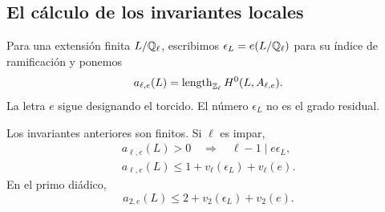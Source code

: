 \subsection{El cálculo de los invariantes locales}

Para una extensión finita $L/\mathbb{Q}_\ell$, escribimos
$\epsilon_L=e(L/\mathbb{Q}_\ell)$ para su índice de ramificación y ponemos
\[
 a_{\ell,e}(L)=\operatorname{length}_{\mathbb{Z}_\ell}H^0(L,A_{\ell,e}).
\]
La letra $e$ sigue designando el torcido. El número $\epsilon_L$
no es el grado residual.

\begin{lema}
\label{lem:fu-invariantes}
Los invariantes anteriores son finitos. Si $\ell$ es impar,
\begin{equation}
 \begin{gathered}
 a_{\ell,e}(L)>0\quad\Longrightarrow\quad
       \ell-1\mid e\epsilon_L,\\
 a_{\ell,e}(L)\le1+v_\ell(\epsilon_L)+v_\ell(e).
 \end{gathered}
 \label{eq:fu-h0-impar}
\end{equation}
En el primo diádico,
\begin{equation}
 a_{2,e}(L)\le2+v_2(\epsilon_L)+v_2(e).
 \label{eq:fu-h0-diadico}
\end{equation}
\end{lema}

